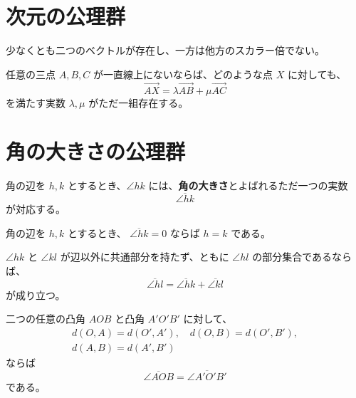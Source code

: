 \section{次元の公理群}

\begin{axm}\label{251101142901}
  少なくとも二つのベクトルが存在し、一方は他方のスカラー倍でない。
\end{axm}

\begin{axm}\label{251101133903}
  任意の三点 \(A,B,C\) が一直線上にないならば、どのような点 \(X\) に対しても、
  \[\overrightarrow{AX}=\lambda\overrightarrow{AB}+\mu\overrightarrow{AC}\]
  を満たす実数 \(\lambda,\mu\) がただ一組存在する。
\end{axm}

\section{角の大きさの公理群}

\begin{axm}
  角の辺を \(h,k\) とするとき、\(\angle hk\) には、\textbf{角の大きさ}とよばれるただ一つの実数
  \[\overline{\angle hk}\]
  が対応する。
\end{axm}

\begin{axm}\label{251101145101}
  角の辺を \(h,k\) とするとき、
  \(\overline{\angle hk}=0\) ならば \(h=k\) である。
\end{axm}

\begin{axm}\label{251101145201}
  \(\angle hk\) と \(\angle kl\) が辺以外に共通部分を持たず、ともに \(\angle hl\) の部分集合であるならば、
  \[\overline{\angle hl}=\overline{\angle hk}+\overline{\angle kl}\]
  が成り立つ。
\end{axm}

\begin{axm}\label{251101144301}
  二つの任意の凸角 \(AOB\) と凸角 \(A'O'B'\) に対して、
  \begin{gather*}
    d(O,A)=d(O',A'),\quad d(O,B)=d(O',B'), \\
    d(A,B)=d(A',B')
  \end{gather*}
  ならば
  \[\overline{\angle AOB}=\overline{\angle A'O'B'}\]
  である。
\end{axm}
